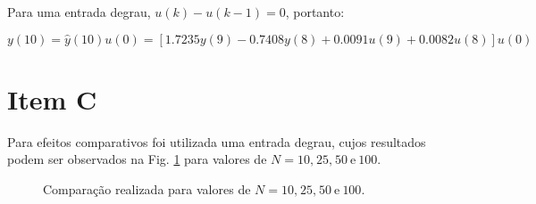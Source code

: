 Para uma entrada degrau, $u(k) - u(k-1) = 0$, portanto:

\begin{equation}
y(10) = \hat{y}(10)u(0) = 
        [1.7235y(9) - 0.7408y(8) + 0.0091u(9) + 0.0082u(8)]u(0)
\end{equation}

\section*{Item C}
Para efeitos comparativos foi utilizada uma entrada degrau, cujos resultados
podem ser observados na Fig. \ref{fig:item_c} para valores de $N = 10\text{,}\
25\text{,}\ 50\ \text{e}\ 100$.

\begin{figure}[htb]
\centering
{}
\quad
{}
\quad
{}
\quad
{}
\caption{Comparação realizada para valores de $N = 10\text{,}\ 25\text{,}\ 50\
         \text{e}\ 100$.}
\label{fig:item_c}
\end{figure}

